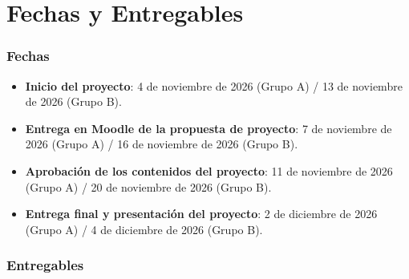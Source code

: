 \chapter{\textbf{Fechas y Entregables}}
\label{chapter:fechas_entregables}

\subsection*{Fechas}
{}
\vspace{5mm}

\begin{itemize}
    \item \textbf{Inicio del proyecto}: 4 de noviembre de 2026 (Grupo A) / 13 de noviembre de 2026 (Grupo B).
    \item \textbf{Entrega en Moodle de la propuesta de proyecto}: 7 de noviembre de 2026 (Grupo A) / 16 de noviembre de 2026 (Grupo B).
    \item \textbf{Aprobación de los contenidos del proyecto}: 11 de noviembre de 2026 (Grupo A) / 20 de noviembre de 2026 (Grupo B).
    \item \textbf{Entrega final y presentación del proyecto}: 2 de diciembre de 2026 (Grupo A) / 4 de diciembre de 2026 (Grupo B).
\end{itemize}

\subsection*{Entregables}
{}
\vspace{5mm}

